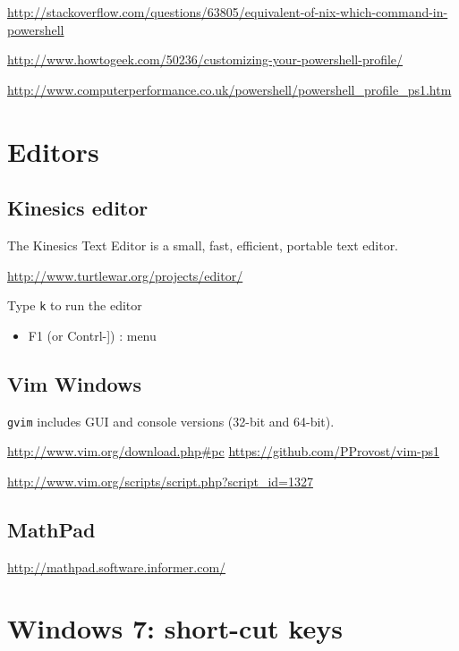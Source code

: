 \url{http://stackoverflow.com/questions/63805/equivalent-of-nix-which-command-in-powershell}

\url{http://www.howtogeek.com/50236/customizing-your-powershell-profile/}

\url{http://www.computerperformance.co.uk/powershell/powershell_profile_ps1.htm}



\section{Editors}

\subsection{Kinesics editor}
\label{sec:kinesics}

The Kinesics Text Editor is a small, fast, efficient, portable text editor.

\url{http://www.turtlewar.org/projects/editor/}

Type \verb!k! to run the editor

\begin{itemize}
  \item F1 (or Contrl-]) : menu
\end{itemize}

\subsection{Vim Windows}
\label{sec:gvim}

\verb!gvim! includes GUI and console versions (32-bit and 64-bit).


  \url{http://www.vim.org/download.php\#pc}
  \url{https://github.com/PProvost/vim-ps1}
  
  \url{http://www.vim.org/scripts/script.php?script_id=1327}

\subsection{MathPad}
\label{sec:MathPad}

\url{http://mathpad.software.informer.com/}

\section{Windows 7: short-cut keys}

